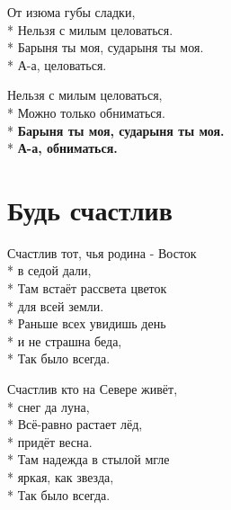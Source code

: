 \medskip

\begin{minipage}{\linewidth}
От изюма губы сладки,\\*
Нельзя с милым целоваться.\\*
Барыня ты моя, сударыня ты моя.\\*
А-а, целоваться.\\
\end{minipage}\par\medskip\nobreak

\medskip

\begin{minipage}{\linewidth}
Нельзя с милым целоваться,\\*
Можно только обниматься.\\*
\textbf{Барыня ты моя, сударыня ты моя.}\\*
\textbf{А-а, обниматься.}\\
\end{minipage}

\vspace{\fill}\newpage

\section{Будь счастлив}
\label{song:Будь_счастлив}

\medskip

\begin{minipage}{\linewidth}
Счастлив тот, чья родина - Восток\\*
в седой дали,\\*
Там встаёт рассвета цветок\\*
для всей земли.\\*
Раньше всех увидишь день\\*
и не страшна беда,\\*
Так было всегда.\\
\end{minipage}\par\medskip\nobreak

\medskip

\begin{minipage}{\linewidth}
Счастлив кто на Севере живёт,\\*
снег да луна,\\*
Всё-равно растает лёд,\\*
придёт весна.\\*
Там надежда в стылой мгле\\*
яркая, как звезда,\\*
Так было всегда.\\
\end{minipage}\par\medskip\nobreak

